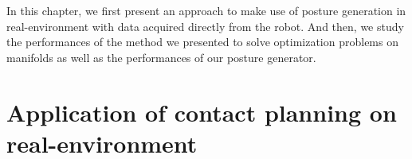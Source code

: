 



In this chapter, we first present an approach to make use of posture generation in real-environment with data acquired directly from the robot.
And then, we study the performances of the method we presented to solve optimization problems on manifolds as well as the performances of our posture generator.

\section{Application of contact planning on real-environment}
\label{sec:application_of_contact_planning_on_real_environment}

